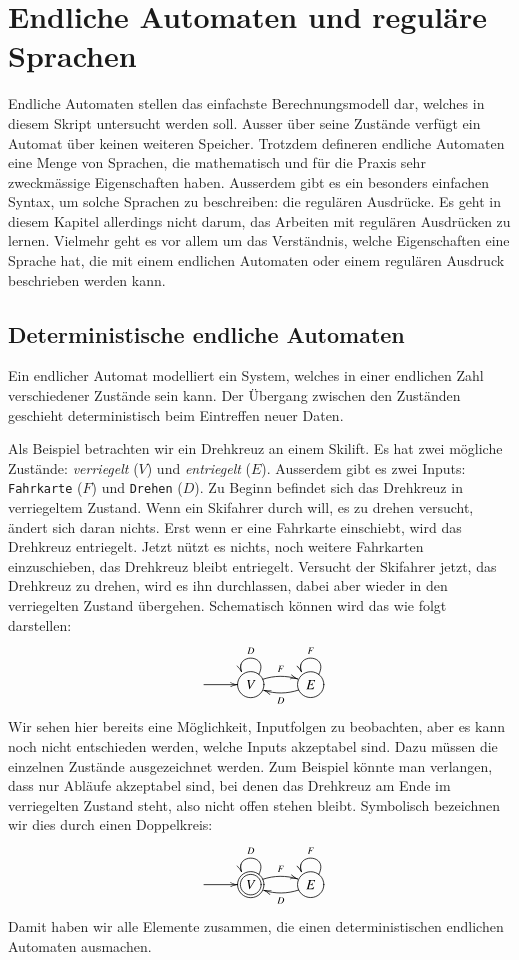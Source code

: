 %
%
\chapter{Endliche Automaten und reguläre Sprachen\label{chapter-regular}}
Endliche Automaten stellen das einfachste Berechnungsmodell
dar, welches in diesem Skript untersucht werden soll.
Ausser über seine Zustände verfügt ein Automat über keinen weiteren
Speicher.
Trotzdem defineren endliche Automaten eine Menge von Sprachen, die 
mathematisch und für die Praxis sehr zweckmässige Eigenschaften
haben.
Ausserdem gibt es ein besonders einfachen Syntax, um
solche Sprachen zu beschreiben: die regulären Ausdrücke.
Es geht in diesem Kapitel allerdings nicht darum, das Arbeiten
mit regulären Ausdrücken zu lernen.
Vielmehr geht es vor allem um das Verständnis, welche Eigenschaften
eine Sprache hat, die mit einem endlichen Automaten oder einem
regulären Ausdruck beschrieben werden kann.

\section{Deterministische endliche Automaten\label{regulaer:dea}}
Ein endlicher Automat modelliert ein System, welches
in einer endlichen Zahl verschiedener Zustände sein kann.
Der Übergang zwischen den Zuständen geschieht deterministisch beim
Eintreffen neuer Daten.

Als Beispiel betrachten wir ein Drehkreuz an einem Skilift.
Es hat zwei mögliche Zustände: {\it  verriegelt} ($V$)
und  {\it entriegelt} ($E$).
Ausserdem gibt es zwei Inputs: {\tt Fahrkarte} ($F$)
und {\tt Drehen} ($D$).
Zu Beginn befindet sich das Drehkreuz in verriegeltem Zustand.
Wenn ein Skifahrer durch will, es zu drehen
versucht, ändert sich daran nichts.
Erst wenn er eine Fahrkarte einschiebt,
wird das Drehkreuz entriegelt.
Jetzt nützt es nichts, noch weitere
Fahrkarten einzuschieben, das Drehkreuz bleibt entriegelt.
Versucht der Skifahrer jetzt, das Drehkreuz zu drehen, wird es
ihn durchlassen, dabei aber wieder in den verriegelten Zustand übergehen.
Schematisch können wird das wie folgt darstellen:
\[
\entrymodifiers={++[o][F]}
\xymatrix{
*+\txt{} \ar[r]
	&{V}\ar@/^/[r]^{F} \ar@(ur,ul)_{D}
		&{E}\ar@/^/[l]^{D} \ar@(ur,ul)_{F}
}
\]
Wir sehen hier bereits eine Möglichkeit, Inputfolgen zu beobachten, 
aber es kann noch nicht entschieden werden, welche Inputs akzeptabel
sind.
Dazu müssen die einzelnen Zustände ausgezeichnet werden.
Zum Beispiel könnte man verlangen, dass nur Abläufe akzeptabel
sind, bei denen das Drehkreuz am Ende im verriegelten Zustand steht,
also nicht offen stehen bleibt.
Symbolisch bezeichnen wir dies durch einen Doppelkreis:
\[
\entrymodifiers={++[o][F]}
\xymatrix{
*+\txt{} \ar[r]
	&*++[o][F=]{V}\ar@/^/[r]^{F} \ar@(ur,ul)_{D}
		&{E}\ar@/^/[l]^{D} \ar@(ur,ul)_{F}
}
\]
Damit haben wir alle Elemente zusammen, die einen deterministischen
endlichen Automaten ausmachen.
